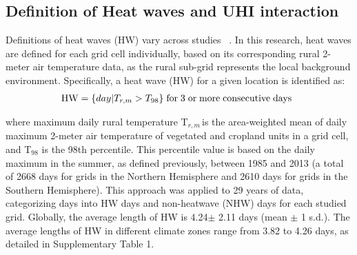 \subsection*{Definition of Heat waves and UHI interaction}Definitions of heat waves (HW) vary across studies\unskip~\cite{2755510:33598930,2755510:33598927} . In this research, heat waves are defined for each grid cell individually, based on its corresponding rural 2-meter air temperature data, as the rural sub-grid represents the local background environment. Specifically, a heat wave (HW) for a given location is identified as:
\let\saveeqnno\theequation
\let\savefrac\frac
\def\dispfrac{\displaystyle\savefrac}
\begin{eqnarray}
\let\frac\dispfrac
\gdef\theequation{1}
\let\theHequation\theequation
\label{dfg-2755510:33598937}
\begin{array}{@{}l}\style{font-family:'Times New Roman'}{\mathrm{HW}=\{day\vert T_{r,m}>T_{98}\}\;\mathrm{for}\;3\;\mathrm{or}\;\mathrm{more}\;\mathrm{consecutive}\;\mathrm{days}}\end{array}
\end{eqnarray}
\global\let\theequation\saveeqnno
\addtocounter{equation}{-1}\ignorespaces 
where maximum daily rural temperature  T\ensuremath{_{r,m\ }}is the area-weighted mean of daily maximum 2-meter air temperature of vegetated and cropland units in a grid cell, and T\ensuremath{_{98}} is the 98th percentile. This percentile value is based on the daily maximum in the summer, as defined previously, between 1985 and 2013 (a total of 2668 days for grids in the Northern Hemisphere and 2610 days for grids in the Southern Hemisphere). This approach was applied to 29 years of data, categorizing days into HW days and non-heatwave (NHW) days for each studied grid. Globally, the average length of HW is 4.24\ensuremath{\pm} 2.11 days (mean \ensuremath{\pm} 1 s.d.). The average lengths of HW in different climate zones range from 3.82 to 4.26 days, as detailed in Supplementary Table 1. 

